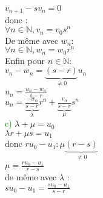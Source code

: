 \documentclass{article}
\begin{document}
$v_{n+1}-sv_n=0$ \\ 
donc : \\ 
$\forall n \in \mathbb{N},v_n=v_0s^n$ \\ 
De même avec $w_n$: \\ 
$\forall n \in \mathbb{N},w_n=w_0r^n$ \\ 
Enfin pour $n \in \mathbb{N}$: \\ 
$v_n-w_n=\underbrace{(s-r)}_{\neq 0}u_n$ \\ 
$u_n=\frac{u_n-w_n}{s-r}$ \\ 
$u_n=\underbrace{\frac{-w_0}{s-r}}_{\lambda}r^n+ \underbrace{\frac{v_0}{s-r}}_{\mu}s^n$ \\ 
\textcolor{green}{c)} $\lambda + \mu =u_0$ \\ 
$\lambda r +\mu s = u_1$ \\ 
donc $ru_0-u_1:\mu\underbrace{(r-s)}_{\neq 0}$ \\ 
$\mu=\frac{ru_0-u_1}{r-s}$ \\ 
de même avec $\lambda$ : \\ 
$su_0-u_1=\frac{su_0-u_1}{s-r}$
\end{document}

